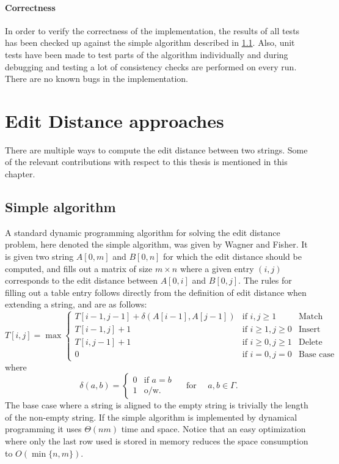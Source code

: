 \documentclass[twoside,11pt,openright]{report}
\newcommand{\str}[3]{#1[#2, #3]}
\begin{document}
\subsubsection{Correctness}
In order to verify the correctness of the implementation, the results of all tests has been checked up against the simple algorithm described in \cref{sec:intro:simple}. Also, unit tests have been made to test parts of the algorithm individually and during debugging and testing a lot of consistency checks are performed on every run. There are no known bugs in the implementation.

\chapter{Edit Distance approaches}
There are multiple ways to compute the edit distance between two strings. Some of the relevant contributions with respect to this thesis is mentioned in this chapter.

\section{Simple algorithm}
\label{sec:intro:simple}
A standard dynamic programming algorithm for solving the edit distance problem, here denoted the simple algorithm, was given by Wagner and Fisher. It is given two string $\str{A}{0}{m}$ and $\str{B}{0}{n}$ for which the edit distance should be computed, and fills out a matrix of size $m \times n$ where a given entry $(i, j)$ corresponds to the edit distance between $\str{A}{0}{i}$ and $\str{B}{0}{j}$. The rules for filling out a table entry follows directly from the definition of edit distance when extending a string, and are as follows:
\[
  T[i, j] = \max \left\{ \begin{array}{lll}
              T[i - 1, j - 1] + \delta(A[i - 1], A[j - 1]) & \text{if } i, j \geq 1 & \text{Match} \\
              T[i - 1, j] + 1       & \text{if } i \geq 1, j \geq 0       & \text{Insert} \\
              T[i, j - 1] + 1       & \text{if } i \geq 0, j \geq 1       & \text{Delete} \\
              0                     & \text{if } i = 0, j = 0             & \text{Base case}
            \end{array} \right.
\]
where
\[
  \delta(a, b) = \begin{cases}
                   0 & \text{if } a = b \\
                   1 & \text{o/w.}
                 \end{cases}
    \quad \text{ for } \quad a, b \in \Gamma.
\]
The base case where a string is aligned to the empty string is trivially the length of the non-empty string. If the simple algorithm is implemented by dynamical programming it uses $\Theta(nm)$ time and space. Notice that an easy optimization where only the last row used is stored in memory reduces the space consumption to $O(\min\{n, m\})$.
\end{document}
